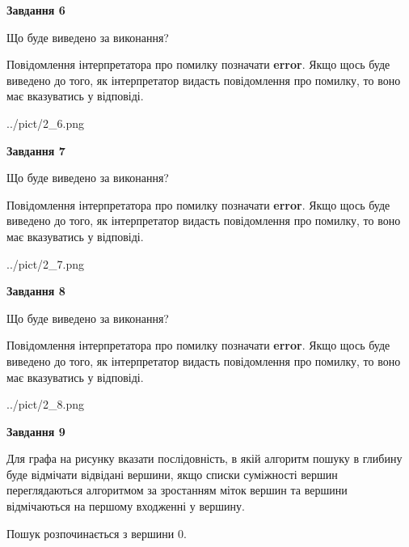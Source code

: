 \documentclass[12pt, ukrainian]{article}
\begin{document}
{\begin {large}
{\begin {center}\textbf{Завдання 6}\end {center}}\par
Що буде виведено за виконання?

Повідомлення інтерпретатора про помилку позначати \textbf{error}.
Якщо щось буде виведено до того, як інтерпретатор видасть повідомлення про помилку, 
то воно має вказуватись у відповіді. \par


\begin{center}
	{../pict/2_6.png}
\end{center}
\newpage

{\begin {center}\textbf{Завдання 7}\end {center}}\par
Що буде виведено за виконання?

Повідомлення інтерпретатора про помилку позначати \textbf{error}.
Якщо щось буде виведено до того, як інтерпретатор видасть повідомлення про помилку, 
то воно має вказуватись у відповіді. \par


\begin{center}
	{../pict/2_7.png}
\end{center}
\newpage

{\begin {center}\textbf{Завдання 8}\end {center}}\par
Що буде виведено за виконання?

Повідомлення інтерпретатора про помилку позначати \textbf{error}.
Якщо щось буде виведено до того, як інтерпретатор видасть повідомлення про помилку, 
то воно має вказуватись у відповіді. \par


\begin{center}
	{../pict/2_8.png}
\end{center}
\newpage

{\begin {center}\textbf{Завдання 9}\end {center}}\par
Для графа на рисунку вказати послідовність, в якій алгоритм пошуку в глибину буде відмічати відвідані вершини, якщо списки суміжності вершин переглядаються алгоритмом за зростанням міток вершин та вершини відмічаються на першому вход\-женні у вершину.\par
Пошук розпочинається з вершини 0.\par


\end{large}}
\end{document}
